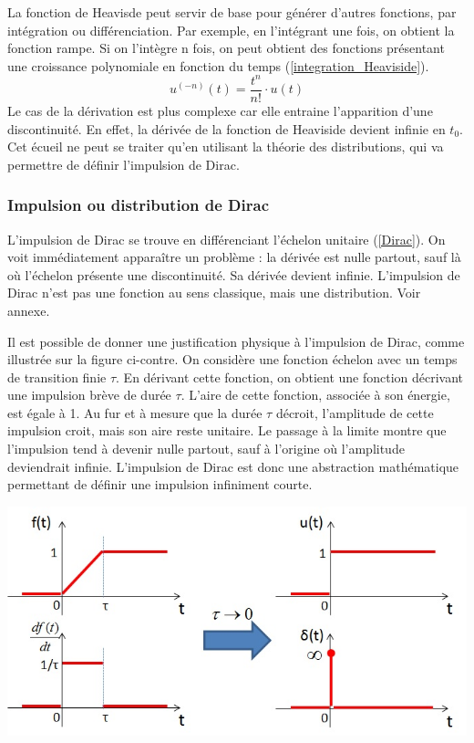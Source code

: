 	La fonction de Heavisde peut servir de base pour générer d'autres fonctions, par intégration ou différenciation. Par exemple, en l'intégrant une fois, on obtient la fonction rampe. Si on l'intègre n fois, on peut obtient des fonctions présentant une croissance polynomiale en fonction du temps (\ref{integration_Heaviside}). 
	\begin{equation}\label{integration_Heaviside}
	u^{(-n)}(t) = \frac{t^{n}}{n!} \cdot u(t)	 	
	\end{equation}	
	Le cas de la dérivation est plus complexe car elle entraine l'apparition d'une discontinuité. En effet, la dérivée de la fonction de Heaviside devient infinie en $t_{0}$. Cet écueil ne peut se traiter qu'en utilisant la théorie des distributions, qui va permettre de définir l'impulsion de Dirac.
	
	\subsubsection{Impulsion ou distribution de Dirac}
	
	L'impulsion de Dirac se trouve en différenciant l'échelon unitaire (\ref{Dirac}). On
	voit immédiatement apparaître un problème : la dérivée est nulle partout, sauf là
	où l'échelon présente une discontinuité. Sa dérivée devient infinie.
	L'impulsion de Dirac n'est pas une fonction au sens classique, mais une
	distribution. Voir annexe. 

	
	\begin{minipage}[l]{0.45\linewidth}
			Il est possible de donner une justification physique à l'impulsion de Dirac, comme illustrée sur la figure ci-contre. On considère une fonction échelon avec un temps de transition finie $\tau$. En dérivant cette fonction, on obtient une fonction décrivant une impulsion brève de durée $\tau$. L'aire de cette fonction, associée à son énergie, est égale à 1. Au fur et à mesure que la durée $\tau$ décroit, l'amplitude de cette impulsion croit, mais son aire reste unitaire. Le passage à la limite montre que l'impulsion tend à devenir nulle partout, sauf à l'origine où l'amplitude deviendrait infinie. L'impulsion de Dirac est donc une abstraction mathématique permettant de définir une impulsion infiniment courte.	
	\end{minipage} \hfill
	\begin{minipage}[r]{0.55\linewidth}
		\includegraphics[scale=0.5]{images/generation_Dirac.jpg} 	
	\end{minipage}
	\vspace{0.5\baselineskip}
	
